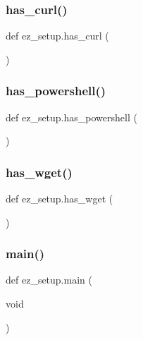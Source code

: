 \subsubsection{\texorpdfstring{has\+\_\+curl()}{has\_curl()}}
{\footnotesize\ttfamily def ez\+\_\+setup.\+has\+\_\+curl (\begin{DoxyParamCaption}{ }\end{DoxyParamCaption})}

\mbox{\label{namespaceez__setup_a6ae1e68431f321c135c69001fcca43b5}} 
\subsubsection{\texorpdfstring{has\+\_\+powershell()}{has\_powershell()}}
{\footnotesize\ttfamily def ez\+\_\+setup.\+has\+\_\+powershell (\begin{DoxyParamCaption}{ }\end{DoxyParamCaption})}

\mbox{\label{namespaceez__setup_acc4250f7e8576ec6578b5dfcabe09d43}} 
\subsubsection{\texorpdfstring{has\+\_\+wget()}{has\_wget()}}
{\footnotesize\ttfamily def ez\+\_\+setup.\+has\+\_\+wget (\begin{DoxyParamCaption}{ }\end{DoxyParamCaption})}

\mbox{\label{namespaceez__setup_abc81dbe1d4caae0b1729c17a6914882e}} 
\subsubsection{\texorpdfstring{main()}{main()}}
{\footnotesize\ttfamily def ez\+\_\+setup.\+main (\begin{DoxyParamCaption}\item[{void}]{ }\end{DoxyParamCaption})}

